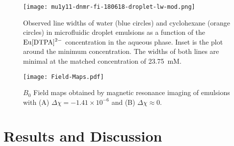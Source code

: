 \begin{figure}
  \begin{center}
    \texttt{[image: mu1y11-dnmr-fi-180618-droplet-lw-mod.png]}
  \end{center}
  \caption{Observed line widths of water (blue circles) and
    cyclohexane (orange circles) in microfluidic droplet emulsions
    as a function of the $\ce{Eu[DTPA]^{2-}}$ concentration in the aqueous phase. Inset is the plot around the minimum
    concentration.
    The widths of both lines are minimal
    at the matched concentration of 23.75~mM. }
    \label{fig:line widths}
\end{figure}


\begin{figure}
  \begin{center}
    \texttt{[image: Field-Maps.pdf]}
  \end{center}
  \caption{$B_0$ Field maps obtained by magnetic resonance imaging of emulsions
  with (A) $\Delta\chi=-1.41\times 10^{-6}$ and (B) $\Delta\chi\approx 0$.
  }
  \label{fig:field-map}
\end{figure}




\section{Results and Discussion}


